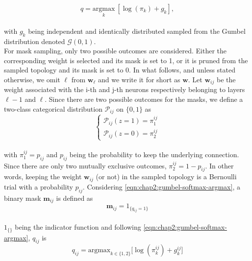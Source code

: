 \begin{equation}
  \label{eqn:chap2:gumbel-softmax-argmax}
  q = \underset{k}{ \text{argmax}} \ [ \log(\pi_k)+g_k ],
\end{equation}\\

with $g_k$ being independent and identically distributed sampled from  the
Gumbel distribution denoted $\mathcal{G}(0,1)$.\\

For mask sampling, only two possible outcomes are considered. Either the
corresponding weight is selected and its mask is set to 1, or it is pruned from
the sampled topology and its mask is set to 0. In what follows, and unless
stated otherwise, we omit $\ell$ from $\bm{w}_\ell$ and we write it for short as
$\bm{w}$. Let $\bm{w}_{ij}$ be the weight associated with the i-th and j-th
neurons respectively belonging to layers $\ell-1$ and $\ell$. Since there are
two possible outcomes for the masks, we define a two-class categorical
distribution $\mathcal{P}_{ij}$ on $\{0,1\}$ as\\

\begin{equation}
  \left\{ \begin{array}{c}
    \mathcal{P}_{ij}(z=1)=\pi_1^{ij} \\
    \mathcal{P}_{ij}(z=0)=\pi_2^{ij}
  \end{array} \right.
\end{equation}\\

with $\pi_1^{ij}=p_{ij}$ and $p_{ij}$ being the probability to keep the
underlying connection. Since there are only two mutually exclusive outcomes,
$\pi_2^{ij}=1-p_{ij}$. In other words, keeping the weight $\bm{w}_{ij}$ (or
not) in the sampled topology is a Bernoulli trial with a probability $p_{ij}$.
Considering \cref{eqn:chap2:gumbel-softmax-argmax}, a binary mask  $\bm{m}_{ij}$
is defined as\\

\begin{equation}
  \label{eqn:chap2:mask_value}
  \bm{m}_{ij} = 1_{\{q_{ij}=1\}}
\end{equation}\\

$1_{\{\}}$ being the indicator function and following
\cref{eqn:chap2:gumbel-softmax-argmax}, $q_{ij}$ is\\

\begin{equation}
  \label{eqn:chap2:q_ij_expression}
  q_{ij} = {\text{argmax}_{k \in \{1,2\}}}\big[\log(\pi_k^{ij})+g_k^{ij}\big]
\end{equation}\\

